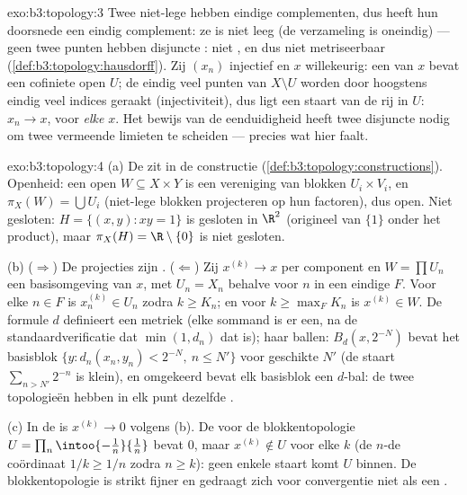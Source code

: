 \begin{solution}{exo:b3:topology:3}
Twee niet-lege  hebben eindige complementen, dus
heeft hun doorsnede een eindig complement: ze is niet leeg (de
verzameling is oneindig) --- geen twee punten hebben disjuncte
: niet , en dus niet metriseerbaar
(\cref{def:b3:topology:hausdorff}). Zij $(x_n)$ injectief en $x$
willekeurig: een  van $x$ bevat een cofiniete open $U$; de
eindig veel punten van $X\setminus U$ worden door hoogstens
eindig veel indices geraakt (injectiviteit), dus ligt een staart
van de rij in $U$: $x_n \to x$, voor \emph{elke} $x$. Het bewijs
van de eenduidigheid heeft twee disjuncte  nodig om twee
vermeende limieten te scheiden --- precies wat hier faalt.
\end{solution}

\begin{solution}{exo:b3:topology:4}
(a) De  zit in de constructie
(\cref{def:b3:topology:constructions}). Openheid: een open $W
\subseteq X \times Y$ is een vereniging van blokken $U_i\times
V_i$, en $\pi_X(W) = \bigcup U_i$ (niet-lege blokken projecteren
op hun factoren), dus open. Niet gesloten: $H = \{(x,y) : xy =
1\}$ is gesloten in $\R^2$ (origineel van $\{1\}$ onder het
 product), maar $\pi_X(H) = \R\setminus\{0\}$ is niet
gesloten.

(b) ($\Rightarrow$) De projecties zijn . ($\Leftarrow$) Zij
$x^{(k)} \to x$ per component en $W = \prod U_n$ een
basisomgeving van $x$, met $U_n = X_n$ behalve voor $n$ in een
eindige $F$. Voor elke $n \in F$ is $x_n^{(k)} \in U_n$ zodra $k
\geq K_n$; en voor $k \geq \max_F K_n$ is $x^{(k)} \in W$. De
formule $d$ definieert een metriek (elke sommand is er een, na de
standaardverificatie dat $\min(1, d_n)$ dat is); haar ballen:
$B_d(x, 2^{-N})$ bevat het basisblok $\{y : d_n(x_n,y_n) <
2^{-N},\ n \leq N'\}$ voor geschikte $N'$ (de staart $\sum_{n >
N'} 2^{-n}$ is klein), en omgekeerd bevat elk basisblok een
$d$-bal: de twee topologieën hebben in elk punt dezelfde
.

(c) In de  is $x^{(k)} \to 0$ volgens (b). De voor
de blokkentopologie  $U = \prod_n
\intoo{-\tfrac1n}{\tfrac1n}$ bevat $0$, maar $x^{(k)} \notin U$
voor elke $k$ (de $n$-de coördinaat $1/k \geq 1/n$ zodra $n \geq
k$): geen enkele staart komt $U$ binnen. De blokkentopologie is
strikt fijner en gedraagt zich voor convergentie niet als een
.
\end{solution}

